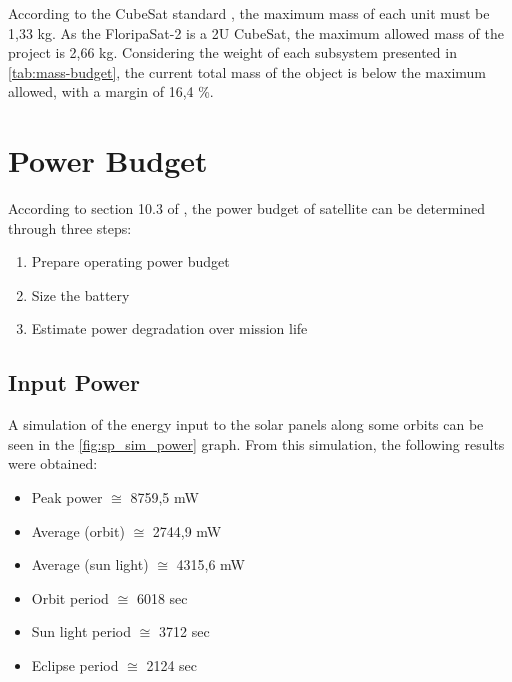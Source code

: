 According to the CubeSat standard \cite{cds}, the maximum mass of each unit must be 1,33 kg. As the FloripaSat-2 is a 2U CubeSat, the maximum allowed mass of the project is 2,66 kg. Considering the weight of each subsystem presented in \autoref{tab:mass-budget}, the current total mass of the object is below the maximum allowed, with a margin of 16,4 \%.

\section{Power Budget} \label{power-budget}

According to section 10.3 of \cite{larson2005}, the power budget of satellite can be determined through three steps:

\begin{enumerate}
    \item Prepare operating power budget
    \item Size the battery
    \item Estimate power degradation over mission life
\end{enumerate}

\subsection{Input Power}

A simulation of the energy input to the solar panels along some orbits can be seen in the \autoref{fig:sp_sim_power} graph. From this simulation, the following results were obtained:

\begin{itemize}
    \item Peak power $\cong$ 8759,5 mW
    \item Average (orbit) $\cong$ 2744,9 mW
    \item Average (sun light) $\cong$ 4315,6 mW
    \item Orbit period $\cong$ 6018 sec
    \item Sun light period $\cong$ 3712 sec
    \item Eclipse period $\cong$ 2124 sec
\end{itemize}

